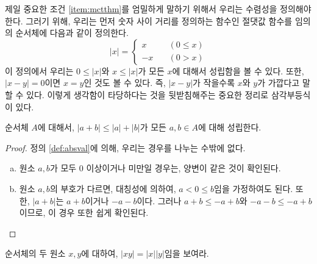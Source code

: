 제일 중요한 조건 \ref{item:mctthm}를 엄밀하게 말하기 위해서 우리는 수렴성을 정의해야 한다.
그러기 위해, 우리는 먼저 숫자 사이 거리를 정의하는 함수인 절댓값 함수를 임의의 순서체에 다음과 같이 정의한다.
\begin{equation}
\label{def:absval}
    |x| = \begin{cases}
    x \quad&(0 \leq x) \\
    -x \quad&(0 > x)
    \end{cases}
\end{equation}
이 정의에서 우리는 $0 \leq |x|$와 $x \leq |x|$가 모든 $x$에 대해서 성립함을 볼 수 있다.
또한, $|x - y| = 0$이면 $x = y$인 것도 볼 수 있다.
즉, $|x - y|$가 작을수록 $x$와 $y$가 가깝다고 말할 수 있다.
이렇게 생각함이 타당하다는 것을 뒷받침해주는 중요한 정리로 삼각부등식이 있다.
\begin{lemma}
\label{lem:triineq}
    순서체 $A$에 대해서, $|a + b| \leq |a| + |b|$가 모든 $a, b \in A$에 대해 성립한다.
\end{lemma}
\begin{proof}
    정의 \ref{def:absval}에 의해, 우리는 경우를 나누는 수밖에 없다.
    \begin{enumerate}[(a)]
    \item 원소 $a, b$가 모두 $0$ 이상이거나 미만일 경우는, 양변이 같은 것이 확인된다.
    \item 원소 $a, b$의 부호가 다르면, 대칭성에 의하여, $a < 0 \leq b$임을 가정하여도 된다.
    또한, $|a + b|$는 $a + b$이거나 $-a - b$이다.
    그러나 $a + b \leq -a + b$와 $-a - b \leq -a + b$이므로, 이 경우 또한 쉽게 확인된다.
    \end{enumerate}
\end{proof}
\begin{exercise}
    순서체의 두 원소 $x, y$에 대하여, $|xy| = |x||y|$임을 보여라.
\end{exercise}

